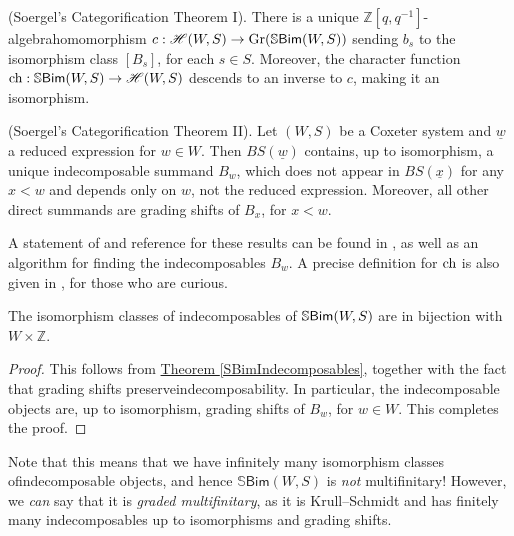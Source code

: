 \noindent\begin{theorem}\textnormal{(Soergel's Categorification Theorem I).}\label{SoergelCategorification} There is a unique $\mathbb{Z}[q, q^{-1}]$-algebra\linebreak homomorphism $c : \mathscr{H}(W, S) \to \textnormal{Gr}(\mathbb{S}\textnormal{\textsf{Bim}}(W, S))$ sending $b_s$ to the isomorphism class $[B_s]$, for each $s \in S$. Moreover, the character function $\textnormal{ch} : \mathbb{S}\textnormal{\textsf{Bim}}(W, S) \to \mathscr{H}(W, S)$ descends to an inverse to $c$, making it an isomorphism.\\
\end{theorem}

\noindent\begin{theorem}\textnormal{(Soergel's Categorification Theorem II).}\label{SBimIndecomposables} Let $(W, S)$ be a Coxeter system and $\underline{w}$ a reduced expression for $w \in W$. Then $BS(\underline{w})$ contains, up to isomorphism, a unique indecomposable summand $B_w$, which does not appear in $BS(\underline{x})$ for any $x < w$ and depends only on $w$, not the reduced expression. Moreover, all other direct summands are grading shifts of $B_x$, for $x < w$.\\
\end{theorem}

\noindent A statement of and reference for these results can be found in \cite[Theorem 5.24]{EMTW20}, as well as an algorithm for finding the indecomposables $B_w$. A precise definition for $\textnormal{ch}$ is also given in \cite[Definition 5.15]{EMTW20}, for those who are curious.\\

\noindent\begin{corollary} The isomorphism classes of indecomposables of $\mathbb{S}\textnormal{\textsf{Bim}}(W, S)$ are in bijection with $W \times \mathbb{Z}$.\\
\end{corollary}

\noindent\begin{proof} This follows from \hyperref[SBimIndecomposables]{Theorem \ref*{SBimIndecomposables}}, together with the fact that grading shifts preserve\linebreak indecomposability. In particular, the indecomposable objects are, up to isomorphism, grading shifts of $B_w$, for $w \in W$. This completes the proof.
\end{proof}
\newpage

\noindent\begin{remark}\label{GradedMultifinitary} Note that this means that we have infinitely many isomorphism classes of\linebreak indecomposable objects, and hence $\mathbb{S}\textsf{Bim}(W, S)$ is {\em not} multifinitary! However, we {\em can} say that it is {\em graded multifinitary}, as it is Krull--Schmidt and has finitely many indecomposables up to isomorphisms and grading shifts.\\
\end{remark}

